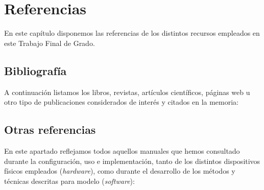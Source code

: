 \documentclass[00-Trabajo_Final.tex]{subfiles}
\begin{document}
\newpage

\section{Referencias}
En este capítulo disponemos las referencias de los distintos recursos empleados en este Trabajo Final de Grado.

\subsection{Bibliografía}
A continuación listamos los libros, revistas, artículos científicos, páginas web u otro tipo de publicaciones considerados de interés y citados en la memoria:




\subsection{Otras referencias}\label{sec:documentacion}

En este apartado reflejamos todos aquellos manuales que hemos consultado durante la configuración, uso e implementación, tanto de los distintos dispositivos físicos empleados (\textit{hardware}), como durante el desarrollo de los métodos y técnicas descritas para modelo (\textit{software}):
\end{document}
